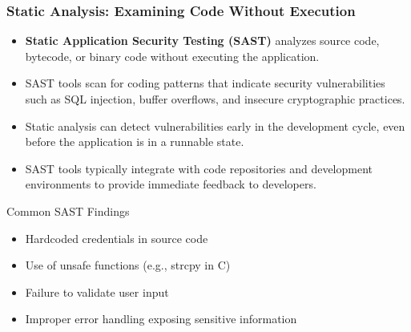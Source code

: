\documentclass{beamer}
\begin{document}
\begin{frame}
\frametitle{Static Analysis: Examining Code Without Execution}
\begin{itemize}
\item \textbf{Static Application Security Testing (SAST)} analyzes source code, bytecode, or binary code without executing the application.
\item SAST tools scan for coding patterns that indicate security vulnerabilities such as SQL injection, buffer overflows, and insecure cryptographic practices.
\item Static analysis can detect vulnerabilities early in the development cycle, even before the application is in a runnable state.
\item SAST tools typically integrate with code repositories and development environments to provide immediate feedback to developers.
\end{itemize}

\begin{exampleblock}{Common SAST Findings}
\scriptsize
\begin{itemize}
\item Hardcoded credentials in source code
\item Use of unsafe functions (e.g., strcpy in C)
\item Failure to validate user input
\item Improper error handling exposing sensitive information
\end{itemize}
\end{exampleblock}
\end{frame}
\end{document}
